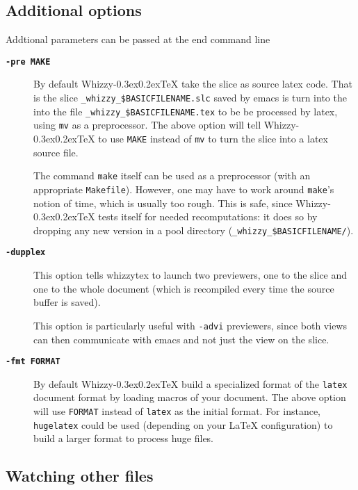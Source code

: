 \documentclass{article}
\let \lst \verb
\def \whizzy{{Whizzy\kern -0.3ex\raise 0.2ex\hbox{\TeX}}}
\begin{document}
\subsection {Additional options}

Addtional parameters can be passed at the end command line

\begin{description}
\item[{\bf {\tt -pre MAKE}}]\indent
\label {make}

By default {\whizzy} take the slice as source latex code. 
That is the slice 
\lst"_whizzy_$BASICFILENAME.slc" saved by emacs is turn into the 
into the file \lst"_whizzy_$BASICFILENAME.tex" to be be processed by latex,
using \lst"mv" as a preprocessor.  The above option will tell {\whizzy} to
use \lst"MAKE" instead of \lst"mv" to turn the slice into a latex source
file.

The command \lst"make" itself can be used as a preprocessor (with an
appropriate \lst"Makefile").  However, one may have to work around
\lst"make"'s notion of time, which is usually too rough. 
This is safe, since
{\whizzy} tests itself for needed recomputations: it does so by dropping any
new version in a pool directory (\lst"_whizzy_$BASICFILENAME/"). %

\item[{\bf {\tt -dupplex}}]\indent
\label {dupplex}

This option tells whizzytex to launch two previewers, one to the slice and
one to the whole document (which is recompiled every time the source buffer
is saved).

This option is particularly useful with \lst"-advi" previewers, since both
views can then communicate with emacs and not just the view on the slice.

\item[{\bf {\tt -fmt FORMAT}}]\indent

By default {\whizzy} build a specialized format of the \lst"latex" document
format by loading macros of your document.  The above option will use
\lst"FORMAT" instead of \lst"latex" as the initial format. For instance,
\lst"hugelatex" could be used (depending on your {\LaTeX} configuration) to
build a larger format to process huge files.

\end{description}



\subsection {Watching other files}
\end{document}
